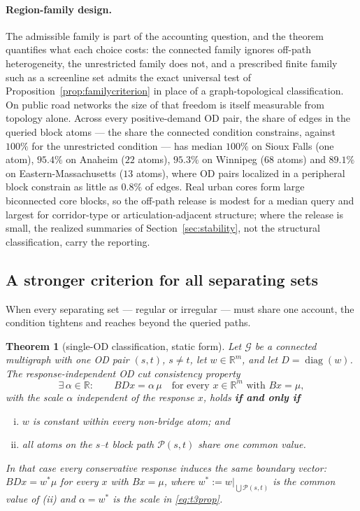 \documentclass[a4paper,fleqn]{cas-sc}
\newtheorem{theorem}{Theorem}
\newcommand{\R}{\mathbb{R}}
\begin{document}
\paragraph{Region-family design.}
The admissible family is part of the accounting question, and the theorem
quantifies what each choice costs: the connected family ignores off-path
heterogeneity, the unrestricted family does not, and a prescribed finite
family such as a screenline set admits the exact universal test of
Proposition~\ref{prop:familycriterion} in place of a graph-topological
classification.
On public road networks the size of that freedom is itself measurable
from topology alone. Across every positive-demand OD pair, the share of
edges in the queried block atoms --- the share the connected condition
constrains, against $100\%$ for the unrestricted condition --- has
median $100\%$ on Sioux Falls (one atom), $95.4\%$ on Anaheim ($22$
atoms), $95.3\%$ on Winnipeg ($68$ atoms) and $89.1\%$ on
Eastern-Massachusetts ($13$ atoms), where OD pairs localized in a
peripheral block constrain as little as $0.8\%$ of edges. Real urban
cores form large biconnected core blocks, so the off-path release is
modest for a median query and largest for corridor-type or
articulation-adjacent structure; where the release is small, the
realized summaries of Section~\ref{sec:stability}, not the structural
classification, carry the reporting.

\subsection{A stronger criterion for all separating sets}\label{sec:allsets}
When every separating set --- regular or irregular --- must share one
account, the condition tightens and reaches beyond the queried paths.

\begin{theorem}[single-OD classification, static form]\label{thm:t3cpmain}
Let $\mathcal{G}$ be a connected multigraph with one OD pair $(s,t)$,
\textbf{$s\neq t$}, let
$w\in\R^m$, and let $D=\operatorname{diag}(w)$. The
\emph{response-independent OD cut consistency property}
\begin{equation}
\exists\,\alpha\in\R:\qquad BDx=\alpha\,\mu
\quad\text{for every }x\in\R^m\text{ with }Bx=\mu,
\label{eq:t3prop}
\end{equation}
with the scale $\alpha$ independent of the response $x$, holds
\textbf{if and only if}
\begin{enumerate}[(i)]
\item $w$ is constant within every non-bridge atom; and
\item all atoms on the $s$--$t$ block path $\mathcal{P}(s,t)$ share
one common value.
\end{enumerate}
In that case every conservative response induces the same boundary vector:
$BDx=w^*\mu$ for every $x$ with $Bx=\mu$, where
$w^*:=w|_{\bigcup\mathcal{P}(s,t)}$ is the common value of (ii) and
$\alpha=w^*$ is the scale in \eqref{eq:t3prop}.
\end{theorem}
\end{document}
